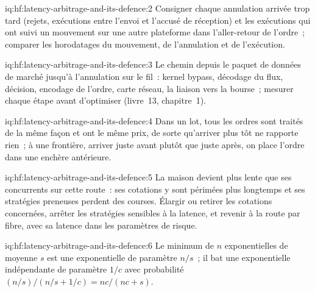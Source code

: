 \begin{solution}{iq:hf:latency-arbitrage-and-its-defence:2}
Consigner chaque annulation arrivée trop tard (rejets, exécutions entre l'envoi et l'accusé de réception) et les exécutions qui ont suivi un mouvement sur une autre plateforme dans
l'aller-retour de l'ordre~; comparer les horodatages du mouvement, de l'annulation et de l'exécution.
\end{solution}

\begin{solution}{iq:hf:latency-arbitrage-and-its-defence:3}
Le chemin depuis le paquet de données de marché jusqu'à l'annulation sur le fil~: kernel bypass, décodage du flux, décision, encodage de l'ordre, carte réseau, la
liaison vers la bourse~; mesurer chaque étape avant d'optimiser (livre~13, chapitre~1).
\end{solution}

\begin{solution}{iq:hf:latency-arbitrage-and-its-defence:4}
Dans un lot, tous les ordres sont traités de la même façon et ont le même prix, de sorte qu'arriver plus tôt ne rapporte rien~; à une frontière, arriver juste avant plutôt que
juste après, on place l'ordre dans une enchère antérieure.
\end{solution}

\begin{solution}{iq:hf:latency-arbitrage-and-its-defence:5}
La maison devient plus lente que ses concurrents sur cette route~: ses cotations y sont périmées plus longtemps et ses stratégies preneuses perdent des courses. Élargir ou
retirer les cotations concernées, arrêter les stratégies sensibles à la latence, et revenir à la route par fibre, avec sa latence dans les paramètres de risque.
\end{solution}

\begin{solution}{iq:hf:latency-arbitrage-and-its-defence:6}
Le minimum de $n$ exponentielles de moyenne $s$ est une exponentielle de paramètre $n/s$~; il bat une exponentielle indépendante de paramètre $1/c$ avec probabilité
$(n/s)/(n/s+1/c)=nc/(nc+s)$.
\end{solution}
